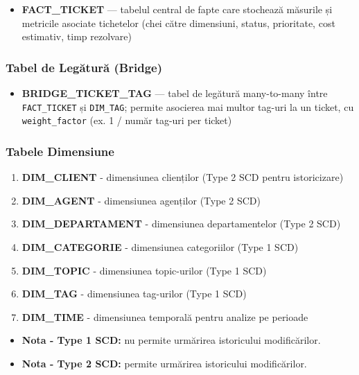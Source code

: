 \begin{itemize}
    \item \textbf{FACT\_TICKET} — tabelul central de fapte care stochează măsurile și metricile asociate tichetelor (chei către dimensiuni, status, prioritate, cost estimativ, timp rezolvare)
\end{itemize}

\subsubsection{Tabel de Legătură (Bridge)}

\begin{itemize}
    \item \textbf{BRIDGE\_TICKET\_TAG} — tabel de legătură many-to-many între \texttt{FACT\_TICKET} și \texttt{DIM\_TAG}; permite asocierea mai multor tag-uri la un ticket, cu \texttt{weight\_factor} (ex. 1 / număr tag-uri per ticket)
\end{itemize}

\subsubsection{Tabele Dimensiune}

\begin{enumerate}
    \item \textbf{DIM\_CLIENT} - dimensiunea clienților (Type 2 SCD pentru istoricizare)
    \item \textbf{DIM\_AGENT} - dimensiunea agenților (Type 2 SCD)
    \item \textbf{DIM\_DEPARTAMENT} - dimensiunea departamentelor (Type 2 SCD)
    \item \textbf{DIM\_CATEGORIE} - dimensiunea categoriilor (Type 1 SCD)
    \item \textbf{DIM\_TOPIC} - dimensiunea topic-urilor (Type 1 SCD)
    \item \textbf{DIM\_TAG} - dimensiunea tag-urilor (Type 1 SCD)
    \item \textbf{DIM\_TIME} - dimensiunea temporală pentru analize pe perioade
\end{enumerate}

\begin{itemize}
    \item \textbf{Nota - Type 1 SCD:} nu permite urmărirea istoricului modificărilor.
    \item \textbf{Nota - Type 2 SCD:} permite urmărirea istoricului modificărilor.
\end{itemize}

